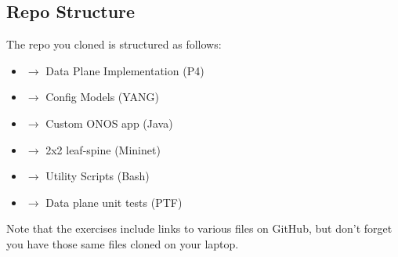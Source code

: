 \documentclass[letterpaper,11pt,english]{sphinxmanual}
\begin{document}
\subsection{Repo Structure}
\label{\detokenize{exercises:repo-structure}}
The repo you cloned is structured as follows:
\begin{itemize}
\item {} 
 \(\rightarrow\) Data Plane Implementation (P4)

\item {} 
 \(\rightarrow\) Config Models (YANG)

\item {} 
 \(\rightarrow\) Custom ONOS app (Java)

\item {} 
 \(\rightarrow\) 2x2 leaf-spine (Mininet)

\item {} 
 \(\rightarrow\) Utility Scripts (Bash)

\item {} 
 \(\rightarrow\) Data plane unit tests (PTF)

\end{itemize}

Note that the exercises include links to various files on GitHub, but
don’t forget you have those same files cloned on your laptop.
\end{document}
